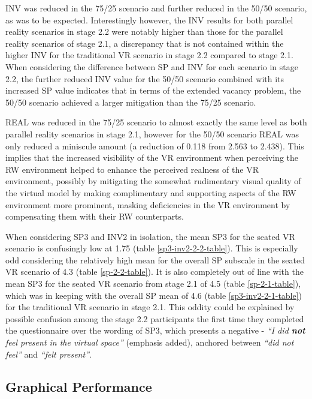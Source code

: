 INV was reduced in the 75/25 scenario and further reduced in the 50/50 scenario, as was to be expected. Interestingly however, the INV results for both parallel reality scenarios in stage 2.2 were notably higher than those for the parallel reality scenarios of stage 2.1, a discrepancy that is not contained within the higher INV for the traditional VR scenario in stage 2.2 compared to stage 2.1. When considering the difference between SP and INV for each scenario in stage 2.2, the further reduced INV value for the 50/50 scenario combined with its increased SP value indicates that in terms of the extended vacancy problem, the 50/50 scenario achieved a larger mitigation than the 75/25 scenario.

REAL was reduced in the 75/25 scenario to almost exactly the same level as both parallel reality scenarios in stage 2.1, however for the 50/50 scenario REAL was only reduced a miniscule amount (a reduction of 0.118 from 2.563 to 2.438). This implies that the increased visibility of the VR environment when perceiving the RW environment helped to enhance the perceived realness of the VR environment, possibly by mitigating the somewhat rudimentary visual quality of the virtual model by making complimentary and supporting aspects of the RW environment more prominent, masking deficiencies in the VR environment by compensating them with their RW counterparts.

When considering SP3 and INV2 in isolation, the mean SP3 for the seated VR scenario is confusingly low at 1.75 (table \ref{sp3-inv2-2-2-table}). This is especially odd considering the relatively high mean for the overall SP subscale in the seated VR scenario of 4.3 (table \ref{sp-2-2-table}). It is also completely out of line with the mean SP3 for the seated VR scenario from stage 2.1 of 4.5 (table \ref{sp-2-1-table}), which was in keeping with the overall SP mean of 4.6 (table \ref{sp3-inv2-2-1-table}) for the traditional VR scenario in stage 2.1. This oddity could be explained by possible confusion among the stage 2.2 participants the first time they completed the questionnaire over the wording of SP3, which presents a negative - \textit{``I did \textbf{not} feel present in the virtual space''} (emphasis added), anchored between \textit{``did not feel''} and \textit{``felt present''}.


\subsection{Graphical Performance}
\label{stage-2-2-framerates}

